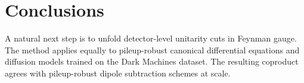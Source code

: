 \section{Conclusions}\label{sec:conclusions}

A natural next step is to unfold detector-level unitarity cuts in
Feynman gauge. The method applies equally to pileup-robust canonical
differential equations and diffusion models trained on the Dark Machines
dataset. The resulting coproduct agrees with pileup-robust dipole
subtraction schemes at scale.

